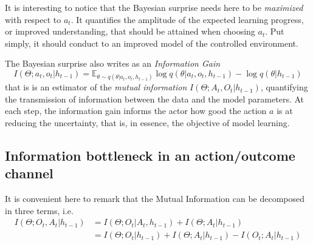 \documentclass[10pt,letterpaper]{article}
\begin{document}
It is interesting to notice that the Bayesian surprise %
needs here to be \emph{maximized} with respect to $a_t$. It quantifies the amplitude of the expected learning progress, or improved understanding, that should be attained when choosing $a_t$. Put simply, it should conduct to an improved model of the controlled environment.



  

The Bayesian surprise also writes as an \emph{Information Gain}  $$I(\Theta;a_t,o_t|h_{t-1})=\mathbb{E}_{\theta\sim q(\theta|a_t,o_t,h_{t-1})}\log q(\theta|a_t, o_t, h_{t-1}) - \log q(\theta|h_{t-1}) $$
that is is an estimator of the \emph{mutual information} $I(\Theta;A_t, O_t|h_{t-1})$, quantifying the transmission of information between the data and the model parameters.
At each step, the information gain informs the actor how good the action $a$ is at reducing the uncertainty, that is, in essence, the objective of model learning. %


\subsection{Information bottleneck in an action/outcome channel}
It is convenient here to remark that the Mutual Information can be decomposed in three terms, i.e. 
\begin{align}\label{eq:MI}
I(\Theta;O_t,A_t|h_{t-1}) &= I(\Theta;O_t|A_t,h_{t-1}) + I(\Theta;A_t|h_{t-1})\\\nonumber
                          &= I(\Theta;O_t|h_{t-1}) + I(\Theta;A_t|h_{t-1}) - I(O_t;A_t|h_{t-1}) 
\end{align}
\end{document}
